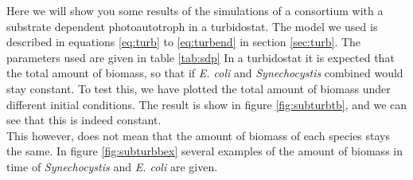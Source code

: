 \documentclass[10pt]{report}
\begin{document}
% 
% 
% 
% 

Here we will show you some results of the simulations of a consortium with a substrate dependent photoautotroph in a turbidostat. The model we used is described in equations \ref{eq:turb} to \ref{eq:turbend} in section \ref{sec:turb}. The parameters used are given in table \ref{tab:sdp}
In a turbidostat it is expected that the total amount of biomass, so that if \textit{E. coli} and \textit{Synechocystis} combined would stay constant. To test this, we have plotted the total amount of biomass under different initial conditions. The result is show in figure \ref{fig:subturbtb}, and we can see that this is indeed constant. \\
This however, does not mean that the amount of biomass of each species stays the same. In figure \ref{fig:subturbbex} several examples of the amount of biomass in time of \textit{Synechocystis} and \textit{E. coli} are given.
\end{document}
